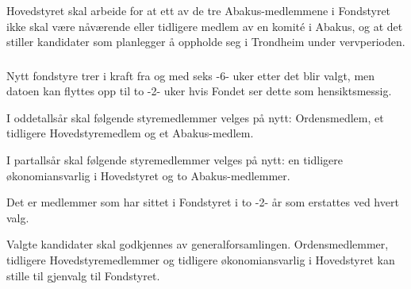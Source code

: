 \subsubsection{}
Hovedstyret skal arbeide for at ett av de tre Abakus-medlemmene i Fondstyret ikke skal være nåværende eller tidligere medlem av en komité i Abakus,
og at det stiller kandidater som planlegger å oppholde seg i Trondheim under vervperioden.

\subsubsection{}
Nytt fondstyre trer i kraft fra og med seks -6- uker etter det blir valgt, men datoen kan flyttes opp til to -2- uker hvis Fondet ser dette som hensiktsmessig.

I oddetallsår skal følgende styremedlemmer velges på nytt: Ordensmedlem, et tidligere
Hovedstyremedlem og et Abakus-medlem.

I partallsår skal følgende styremedlemmer velges på nytt: en tidligere
økonomiansvarlig i Hovedstyret og to Abakus-medlemmer.

Det er medlemmer som har sittet i Fondstyret i to -2- år som erstattes ved hvert valg.

Valgte kandidater skal godkjennes av generalforsamlingen. Ordensmedlemmer,
tidligere Hovedstyremedlemmer og tidligere økonomiansvarlig i Hovedstyret kan
stille til gjenvalg til Fondstyret.
